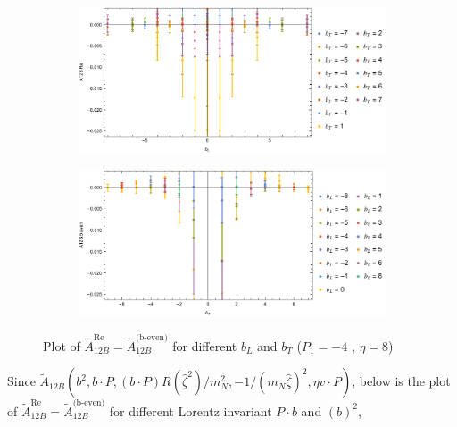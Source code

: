 \documentclass[]{article}
\numberwithin{equation}{section}
\newcommand{\tcdot}{{\cdot}}
\newcommand{\tAmp}{\widetilde{A}}
\newcommand{\tAmp}{\ensuremath{\widetilde{A}^{(+)}}}
\newcommand{\bvec}{b}
\newcommand{\mN}{m_N}
\newcommand{\zetahat}{{\hat \zeta}}
\begin{document}
\begin{figure}[h!]
     \centering
     \begin{subfigure}[b]{0.45\textwidth}
         \centering
         \includegraphics[width=\textwidth]{Amp_plots/bL_A12B_b_even_P1_-4_eta_8.pdf}
     \end{subfigure}
     \begin{subfigure}[b]{0.45\textwidth}
         \centering
         \includegraphics[width=\textwidth]{Amp_plots/bT_A12B_b_even_P1_-4_eta_8.pdf}
     \end{subfigure}
        \caption{Plot of  $\tAmp^{\text{Re}}_{12B}=\tAmp^{\text{(b-even)}}_{12B}$ for different $b_{L}$ and $b_{T}$  ($P_{1} = -4$ , $\eta=8$)}
\end{figure}
\pagebreak
Since $\tAmp_{12B}(\bvec^2,\bvec \tcdot P,(\bvec \tcdot P) R(\zetahat^2)/\mN^2,-1/(\mN\zetahat)^2,\eta v \tcdot P)$, below is the plot of $\tAmp^{\text{Re}}_{12B}=\tAmp^{\text{(b-even)}}_{12B}$ for different Lorentz invariant $P\cdot b$ and $(b)^2$,
\end{document}
